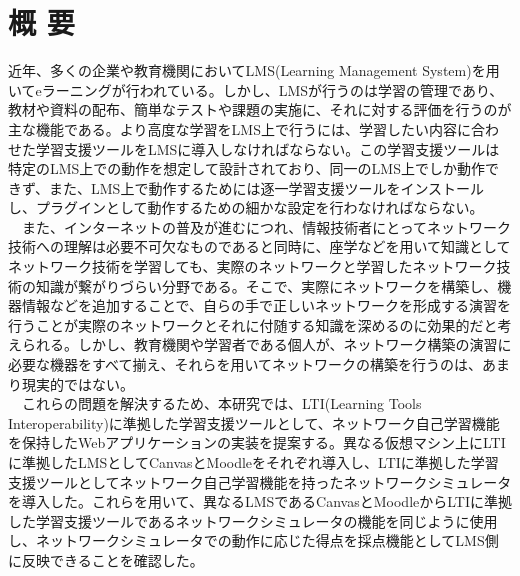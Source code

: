 \section*{\center 概 要}

近年、多くの企業や教育機関においてLMS(Learning Management System)を用いてeラーニングが行われている。しかし、LMSが行うのは学習の管理であり、教材や資料の配布、簡単なテストや課題の実施に、それに対する評価を行うのが主な機能である。より高度な学習をLMS上で行うには、学習したい内容に合わせた学習支援ツールをLMSに導入しなければならない。この学習支援ツールは特定のLMS上での動作を想定して設計されており、同一のLMS上でしか動作できず、また、LMS上で動作するためには逐一学習支援ツールをインストールし、プラグインとして動作するための細かな設定を行わなければならない。\\
　また、インターネットの普及が進むにつれ、情報技術者にとってネットワーク技術への理解は必要不可欠なものであると同時に、座学などを用いて知識としてネットワーク技術を学習しても、実際のネットワークと学習したネットワーク技術の知識が繋がりづらい分野である。そこで、実際にネットワークを構築し、機器情報などを追加することで、自らの手で正しいネットワークを形成する演習を行うことが実際のネットワークとそれに付随する知識を深めるのに効果的だと考えられる。しかし、教育機関や学習者である個人が、ネットワーク構築の演習に必要な機器をすべて揃え、それらを用いてネットワークの構築を行うのは、あまり現実的ではない。\\
　これらの問題を解決するため、本研究では、LTI(Learning Tools Interoperability)に準拠した学習支援ツールとして、ネットワーク自己学習機能を保持したWebアプリケーションの実装を提案する。異なる仮想マシン上にLTIに準拠したLMSとしてCanvasとMoodleをそれぞれ導入し、LTIに準拠した学習支援ツールとしてネットワーク自己学習機能を持ったネットワークシミュレータを導入した。これらを用いて、異なるLMSであるCanvasとMoodleからLTIに準拠した学習支援ツールであるネットワークシミュレータの機能を同じように使用し、ネットワークシミュレータでの動作に応じた得点を採点機能としてLMS側に反映できることを確認した。
